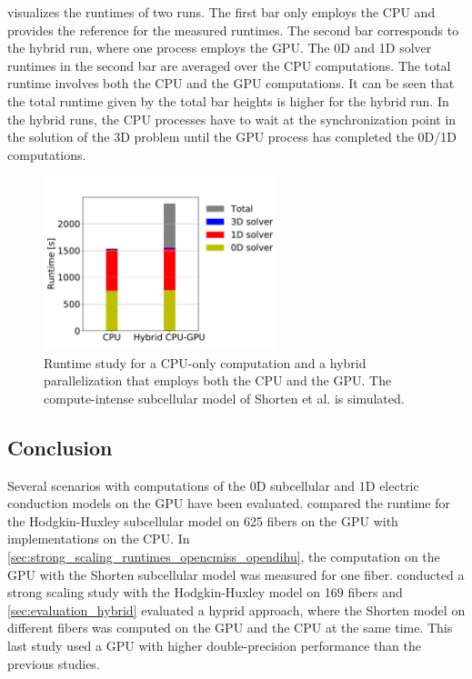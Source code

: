  visualizes the runtimes of two runs. The first bar only employs the CPU and provides the reference for the measured runtimes. The second bar corresponds to the hybrid run, where one process employs the GPU. The 0D and 1D solver runtimes in the second bar are averaged over the CPU computations. The total runtime involves both the CPU and the GPU computations.
It can be seen that the total runtime given by the total bar heights is higher for the hybrid run. In the hybrid runs, the CPU processes have to wait at the synchronization point in the solution of the 3D problem until the GPU process has completed the 0D/1D computations.

\begin{figure}
  \centering%
  \includegraphics[width=0.6\textwidth]{images/results/studies/17_shorten_gpu.pdf}%
  \caption{Runtime study for a CPU-only computation and a hybrid parallelization that employs both the CPU and the GPU. The compute-intense subcellular model of Shorten et al. is simulated.}%
  \label{fig:17_shorten_gpu}%
\end{figure}

\subsection{Conclusion}

Several scenarios with computations of the 0D subcellular and 1D electric conduction models on the GPU have been evaluated. 
 compared the runtime for the Hodgkin-Huxley subcellular model on 625 fibers on the GPU with implementations on the CPU.
In \cref{sec:strong_scaling_runtimes_opencmiss_opendihu}, the computation on the GPU with the Shorten subcellular model was measured for one fiber.
 conducted a strong scaling study with the Hodgkin-Huxley model on 169 fibers and \cref{sec:evaluation_hybrid} evaluated a hyprid approach, where the Shorten model on different fibers was computed on the GPU and the CPU at the same time. This last study used a GPU with higher double-precision performance than the previous studies.


